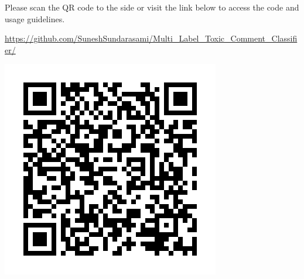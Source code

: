 
{
    \begin{minipage}{0.75\linewidth}
        Please scan the QR code to the side or visit the link below to access the code and usage guidelines.

        \noindent\url{https://github.com/SuneshSundarasami/Multi_Label_Toxic_Comment_Classifier/}
    \end{minipage}
    \begin{minipage}{0.24\linewidth}
        \centering
        \includegraphics[scale=0.5]{figures/github_tcc_qrcode.png}
    \end{minipage}
}

